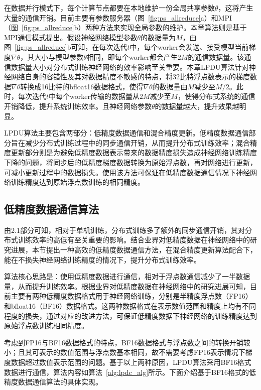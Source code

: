 在数据并行模式下，每个计算节点都要在本地维护一份全局共享参数$\theta$，这将产生大量的通信开销。目前主要有参数服务器（图~\ref{fig:ps_allreduce}a）和MPI（图~\ref{fig:ps_allreduce}b）两种方法来实现全局参数的维护。本章算法则是基于MPI通信模式提出。假设神经网络模型参数$\theta$的数据量为$M$，由图~\ref{fig:ps_allreduce}b可知，在每次迭代$t$中，每个worker会发送、接受模型当前梯度$\nabla\theta$，其大小与模型参数$\theta$相同，即每个worker都会产生$2M$的通信数据量。该通信数据量大小对分布式训练神经网络的效率影响至关重要。本章LPDU算法针对神经网络自身的容错性及其对数据精度不敏感的特点，将32比特浮点数表示的梯度数据$\nabla\theta$转换成16比特的bfloat16数据格式，使得$\nabla\theta$的数据量由$M$减少至$M/2$。此时，每次迭代$t$中每个worker传输的数据量从$2M$减少至$M$，使得分布式系统的通信开销降低，提升系统训练效率。且神经网络参数$\theta$的数据量越大，提升效果越明显。

LPDU算法主要包含两部分：低精度数据通信和混合精度更新。低精度数据通信部分旨在减少分布式训练过程中的同步通信开销，从而提升分布式训练效率；混合精度更新部分则是为避免低精度数据表示带来的数据精度损失造成神经网络训练精度下降的问题，将同步后的低精度梯度数据转换为原始浮点数，再对网络进行更新，可减小更新过程中的数据损失。使用该方法可保证在低精度数据通信情况下神经网络训练精度达到原始浮点数训练的相同精度。
\subsection{低精度数据通信算法}

由2.1部分可知，相对于单机训练，分布式训练多了额外的同步通信开销，其对分布式训练效率的高低有至关重要的影响。结合业界对低精度数据在神经网络中的研究进展，本节提出一种高效的低精度数据通信方法，在混合精度更新算法配合下，能在不损失神经网络训练精度的情况下，提升分布式训练效率。

算法核心思路是：使用低精度数据进行通信，相对于浮点数通信减少了一半数据量，从而提升训练效率。根据业界对低精度数据在神经网络中的研究进展可知，目前主要有两种低精度数据格式用于神经网络训练，分别是半精度浮点数（FP16）和bfloat16（BF16）数据格式。这两种数据格式在表示数值范围和精度上均有不同程度的损失，通过对应的改进方法，可保证低精度数据下神经网络的训练精度达到原始浮点数训练相同精度。

考虑到FP16与BF16数据格式的特点，BF16数据格式与浮点数之间的转换开销较小；且其可表示的数值范围与浮点数基本相同，故不需要考虑FP16表示情况下梯度数据超过数值表示范围的问题。基于以上两种原因，LPDU算法采用BF16格式数据进行通信，算法内容如算法~\ref{alg:lpdc_alg}所示。下面介绍基于BF16格式的低精度数据通信算法的具体实现。

